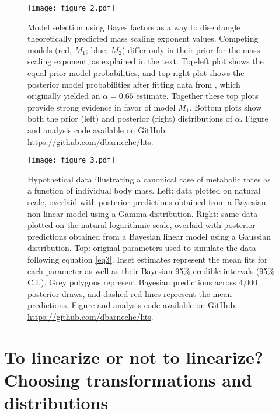 \documentclass[a4paper,12pt]{article}
\begin{document}
\bigskip
\bigskip

\begin{figure}[!ht]
  \begin{center}
    \texttt{[image: figure\_2.pdf]}
  \end{center}
  \caption{Model selection using Bayes factors as a way to disentangle theoretically predicted mass scaling exponent values. Competing models (red, $M_1$; blue, $M_2$) differ only in their prior for the mass scaling exponent, as explained in the text. Top-left plot shows the equal prior model probabilities, and top-right plot shows the posterior model probabilities after fitting data from \cite{barneche2019functecol}, which originally yielded an $\alpha = 0.65$ estimate. Together these top plots provide strong evidence in favor of model $M_1$. Bottom plots show both the prior (left) and posterior (right) distributions of $\alpha$. Figure and analysis code available on GitHub: \url{https://github.com/dbarneche/hts}.}
  \label{fig2}
\end{figure}

\bigskip
\bigskip

\begin{figure}[!ht]
  \begin{center}
    \texttt{[image: figure\_3.pdf]}
  \end{center}
  \caption{Hypothetical data illustrating a canonical case of metabolic rates as a function of individual body mass. Left: data plotted on natural scale, overlaid with posterior predictions obtained from a Bayesian non-linear model using a Gamma distribution. Right: same data plotted on the natural logarithmic scale, overlaid with posterior predictions obtained from a Bayesian linear model using a Gaussian distribution. Top: original parameters used to simulate the data following equation \ref{eq3}. Inset estimates represent the mean fits for each parameter as well as their Bayesian 95\% credible intervals (95\% C.I.). Grey polygons represent Bayesian predictions across 4,000 posterior draws, and dashed red lines represent the mean predictions. Figure and analysis code available on GitHub: \url{https://github.com/dbarneche/hts}.}
  \label{fig3}
\end{figure}

\bigskip
\bigskip

\section{To linearize or not to linearize? Choosing transformations and distributions}
\label{distributions}
\end{document}
